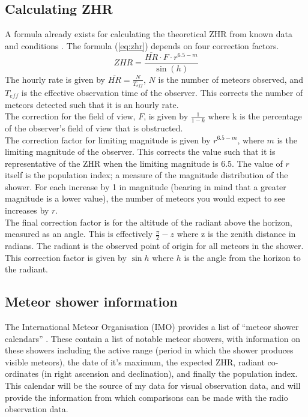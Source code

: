 \subsection{Calculating ZHR}
A formula already exists for calculating the theoretical ZHR from known data and conditions \cite{zhr}. The formula (\ref{eq:zhr}) depends on four correction factors.
\begin{equation}{ZHR} = \frac{\overline{HR} \cdot F \cdot r^{6.5-{m}}}{\sin \left( h \right)}\label{eq:zhr} \end{equation}
The hourly rate is given by $\overline{HR} = \frac{N}{T_{eff}}$, $N$ is the number of meteors observed, and $T_{eff}$ is the effective observation time of the observer. This corrects the number of meteors detected such that it is an hourly rate. \\
The correction for the field of view, $F$, is given by $\frac{1}{1-k}$ where k is the percentage of the observer's field of view that is obstructed. \\
The correction factor for limiting magnitude is given by $r^{6.5-m}$, where $m$ is the limiting magnitude of the observer. This corrects the value such that it is representative of the ZHR when the limiting magnitude is 6.5.  The value of $r$ itself is the population index; a measure of the magnitude distribution of the shower. For each increase by 1 in magnitude (bearing in mind that a greater magnitude is a lower value), the number of meteors you would expect to see increases by $r$.\\
The final correction factor is for the altitude of the radiant above the horizon, measured as an angle. This is effectively $\frac{\pi}{2}-z$ where z is the zenith distance in radians. The radiant is the observed point of origin for all meteors in the shower. This correction factor is given by $\sin h$ where $h$ is the angle from the horizon to the radiant.\\
\subsection{Meteor shower information}
The International Meteor Organisation (IMO) provides a list of ``meteor shower calendars'' \cite{imo_meteor_calendar}. These contain a list of notable meteor showers, with information on these showers including the active range (period in which the shower produces visible meteors), the date of it's maximum, the expected ZHR, radiant co-ordinates (in right ascension and declination), and finally the population index. This calendar will be the source of my data for visual observation data, and will provide the information from which comparisons can be made with the radio observation data.
